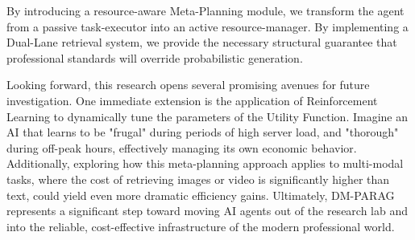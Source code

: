 \documentclass[12pt,en]{elegantpaper}
\begin{document}
By introducing a resource-aware Meta-Planning module, we transform the agent from a passive task-executor into an active resource-manager. By implementing a Dual-Lane retrieval system, we provide the necessary structural guarantee that professional standards will override probabilistic generation.

Looking forward, this research opens several promising avenues for future investigation. One immediate extension is the application of Reinforcement Learning to dynamically tune the parameters of the Utility Function. Imagine an AI that learns to be "frugal" during periods of high server load, and "thorough" during off-peak hours, effectively managing its own economic behavior. Additionally, exploring how this meta-planning approach applies to multi-modal tasks, where the cost of retrieving images or video is significantly higher than text, could yield even more dramatic efficiency gains. Ultimately, DM-PARAG represents a significant step toward moving AI agents out of the research lab and into the reliable, cost-effective infrastructure of the modern professional world.







\end{document}
